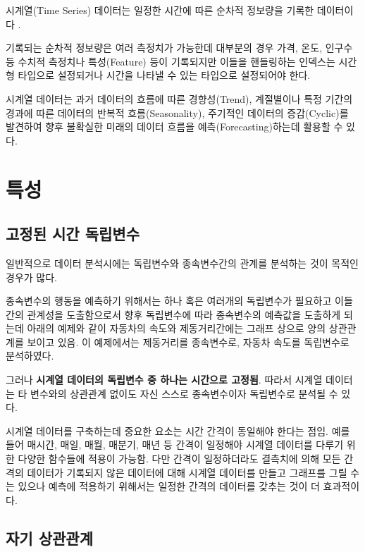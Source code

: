 \documentclass[
]{book}
\begin{document}
시계열(Time Series) 데이터는 일정한 시간에 따른 순차적 정보량을 기록한 데이터이다 .

기록되는 순차적 정보량은 여러 측정치가 가능한데 대부분의 경우 가격, 온도, 인구수 등 수치적 측정치나 특성(Feature) 등이 기록되지만 이들을 핸들링하는 인덱스는 시간형 타입으로 설정되거나 시간을 나타낼 수 있는 타입으로 설정되어야 한다.

시계열 데이터는 과거 데이터의 흐름에 따른 경향성(Trend), 계절별이나 특정 기간의 경과에 따른 데이터의 반복적 흐름(Seasonality), 주기적인 데이터의 증감(Cyclic)를 발견하여 향후 불확실한 미래의 데이터 흐름을 예측(Forecasting)하는데 활용할 수 있다.

\hypertarget{uxd2b9uxc131}{%
\section{특성}\label{uxd2b9uxc131}}

\hypertarget{uxace0uxc815uxb41c-uxc2dcuxac04-uxb3c5uxb9bduxbcc0uxc218}{%
\subsection{고정된 시간 독립변수}\label{uxace0uxc815uxb41c-uxc2dcuxac04-uxb3c5uxb9bduxbcc0uxc218}}

일반적으로 데이터 분석시에는 독립변수와 종속변수간의 관계를 분석하는 것이 목적인 경우가 많다.

종속변수의 행동을 예측하기 위해서는 하나 혹은 여러개의 독립변수가 필요하고 이들간의 관계성을 도출함으로서 향후 독립변수에 따라 종속변수의 예측값을 도출하게 되는데 아래의 예제와 같이 자동차의 속도와 제동거리간에는 그래프 상으로 양의 상관관계를 보이고 있음. 이 예제에서는 제동거리를 종속변수로, 자동차 속도를 독립변수로 분석하였다.

그러나 \textbf{시계열 데이터의 독립변수 중 하나는 시간으로 고정됨}. 따라서 시계열 데이터는 타 변수와의 상관관계 없이도 자신 스스로 종속변수이자 독립변수로 분석될 수 있다.

시계열 데이터를 구축하는데 중요한 요소는 시간 간격이 동일해야 한다는 점임. 예를 들어 매시간, 매일, 매월, 매분기, 매년 등 간격이 일정해야 시계열 데이터를 다루기 위한 다양한 함수들에 적용이 가능함. 다만 간격이 일정하더라도 결측치에 의해 모든 간격의 데이터가 기록되지 않은 데이터에 대해 시계열 데이터를 만들고 그래프를 그릴 수는 있으나 예측에 적용하기 위해서는 일정한 간격의 데이터를 갖추는 것이 더 효과적이다.

\hypertarget{uxc790uxae30-uxc0c1uxad00uxad00uxacc4}{%
\subsection{자기 상관관계}\label{uxc790uxae30-uxc0c1uxad00uxad00uxacc4}}
\end{document}
